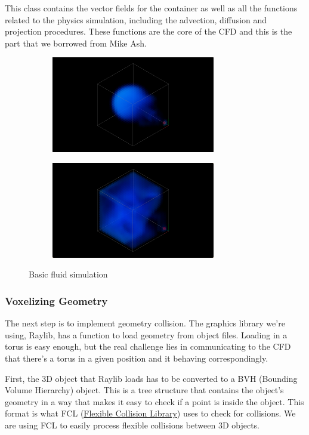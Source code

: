 \documentclass[a4paper,12pt]{article}
\begin{document}
This class contains the vector fields for the container as well as all the
functions related to the physics simulation, including the advection, diffusion
and projection procedures. These functions are the core of the CFD and
this is the part that we borrowed from Mike Ash.

\begin{figure}[H]
    \centering
    \begin{subfigure}[t]{0.45\textwidth}
        \centering
        \includegraphics[height=1.65in]{resources/core1.png}
    \end{subfigure}
    \hfill
    \begin{subfigure}[t]{0.45\textwidth}
        \centering
        \includegraphics[height=1.65in]{resources/core2.png}
    \end{subfigure}
	\caption{Basic fluid simulation}
\end{figure}

\subsubsection{Voxelizing Geometry}
The next step is to implement geometry collision. The graphics library we're using,
Raylib, has a function to load geometry from object files. Loading in a torus is
easy enough, but the real challenge lies in communicating to the CFD that there's
a torus in a given position and it behaving correspondingly.

First, the 3D object that Raylib loads has to be converted to a BVH (Bounding Volume
Hierarchy) object. This is a tree structure that contains the object's geometry in
a way that makes it easy to check if a point is inside the object. This format
is what FCL (\href{https://github.com/flexible-collision-library/fcl}{Flexible Collision Library})
uses to check for collisions. We are using FCL to easily process flexible
collisions between 3D objects.
\end{document}
